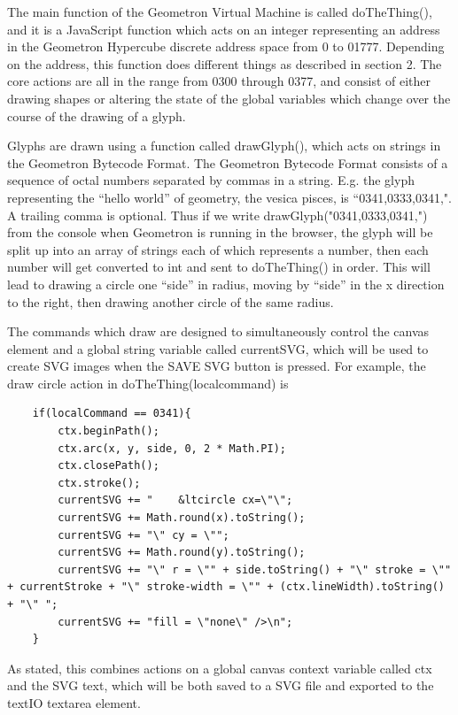 \documentclass[11pt]{article}
\begin{document}
    The main function of the Geometron Virtual Machine is called doTheThing(), and it is a JavaScript function which acts on an integer representing an address in the Geometron Hypercube discrete address space from 0 to 01777.  Depending on the address, this function does different things as described in section 2.  The core actions are all in the range from 0300 through 0377, and consist of either drawing shapes or altering the state of the global variables which change over the course of the drawing of a glyph.  




    Glyphs are drawn using a function called drawGlyph(), which acts on strings in the Geometron Bytecode Format.  The Geometron Bytecode Format consists of a sequence of octal numbers separated by commas in a string.  E.g. the glyph representing the ``hello world'' of geometry, the vesica pisces, is ``0341,0333,0341,".  A trailing comma is optional.  Thus if we write drawGlyph("0341,0333,0341,") from the console when Geometron is running in the browser, the glyph will be split up into an array of strings each of which represents a number, then each number will get converted to int and sent to doTheThing() in order.  This will lead to drawing a circle one ``side'' in radius, moving by ``side'' in the x direction to the right, then drawing another circle of the same radius.   




    The commands which draw are designed to simultaneously control the canvas element and a global string variable called currentSVG, which will be used to create SVG images when the SAVE SVG button is pressed.  For example, the draw circle action in doTheThing(localcommand) is 


\begin{verbatim}
    if(localCommand == 0341){
        ctx.beginPath();
        ctx.arc(x, y, side, 0, 2 * Math.PI);
        ctx.closePath();
        ctx.stroke();
        currentSVG += "    &ltcircle cx=\"\";
        currentSVG += Math.round(x).toString();
        currentSVG += "\" cy = \"";
        currentSVG += Math.round(y).toString();
        currentSVG += "\" r = \"" + side.toString() + "\" stroke = \"" + currentStroke + "\" stroke-width = \"" + (ctx.lineWidth).toString() + "\" ";
        currentSVG += "fill = \"none\" />\n";		
    }
\end{verbatim}


    As stated, this combines actions on a global canvas context variable called ctx and the SVG text, which will be both saved to a SVG file and exported to the textIO textarea element.   
\end{document}
